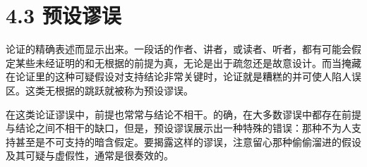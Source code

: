 \section*{4.3 预设谬误}
论证的精确表述而显示出来。一段话的作者、讲者，或读者、听者，都有可能会假定某些未经证明的和无根据的前提为真，无论是出于疏忽还是故意设计。而当掩藏在论证里的这种可疑假设对支持结论非常关键时，论证就是糟糕的并可使人陷人误区。这类无根据的跳跃就被称为预设谬误。

在这类论证谬误中，前提也常常与结论不相干。的确，在大多数谬误中都存在前提与结论之间不相干的缺口，但是，预设谬误展示出一种特殊的错误：那种不为人支持甚至是不可支持的暗含假定。要揭露这样的谬误，注意留心那种偷偷溜进的假设及其可疑与虚假性，通常是很奏效的。 